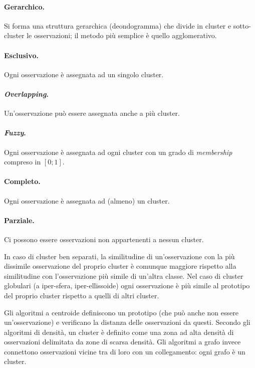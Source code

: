 \documentclass[11pt, a4page, twocolumn]{article}
\begin{document}
\paragraph{Gerarchico.}
Si forma una struttura gerarchica (deondogramma) che divide in cluster e sotto-cluster le osservazioni; il metodo più semplice è quello agglomerativo.

\paragraph{Esclusivo.}
Ogni osservazione è assegnata ad un singolo cluster.
\paragraph{\textit{Overlapping}.}
Un'osservazione può essere assegnata anche a più cluster.
\paragraph{\textit{Fuzzy}.}
Ogni osservazione è assegnata ad ogni cluster con un grado di \textit{membership} compreso in $[0;1]$.

\paragraph{Completo.}
Ogni osservazione è assegnata ad (almeno) un cluster.
\paragraph{Parziale.}
Ci possono essere osservazioni non appartenenti a nessun cluster. \newline

In caso di cluster ben separati, la similitudine di un'osservazione con la più dissimile osservazione del proprio cluster è comunque maggiore rispetto alla similitudine con l'osservazione più simile di un'altra classe.
Nel caso di cluster globulari (a iper-sfera, iper-ellissoide) ogni osservazione è più simile al prototipo del proprio cluster rispetto a quelli di altri cluster.

Gli algoritmi a centroide definiscono un prototipo (che può anche non essere un'osservazione) e verificano la distanza delle osservazioni da questi.
Secondo gli algoritmi di densità, un cluster è definito come una zona ad alta densità di osservazioni delimitata da zone di scarsa densità.
Gli algoritmi a grafo invece connettono osservazioni vicine tra di loro con un collegamento: ogni grafo è un cluster. \newline
\end{document}
